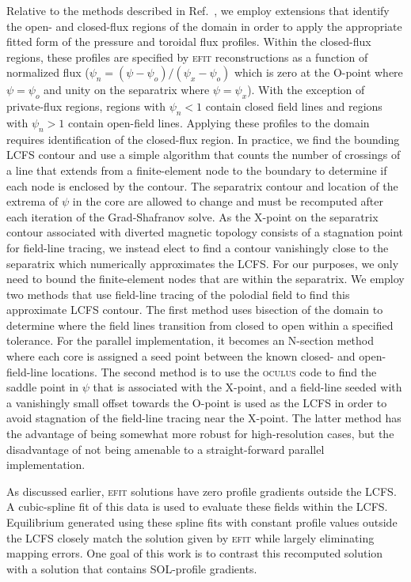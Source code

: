 \documentclass[english,aps,superscriptaddress,showkeys,showpacs,prepri,twocolumn]{revtex4}
\begin{document}
Relative to the methods described in Ref.~\cite{Howell14}, we employ extensions
that identify the open- and closed-flux regions of the domain in order to apply
the appropriate fitted form of the pressure and toroidal flux profiles. Within
the closed-flux regions, these profiles are specified by \textsc{efit}
reconstructions as a function of normalized flux
($\psi_n = (\psi - \psi_o)/(\psi_x - \psi_o)$ which is zero at the O-point
where $\psi=\psi_o$ and unity on the separatrix where $\psi=\psi_x$).  With the
exception of private-flux regions, regions with $\psi_n<1$ contain closed field
lines and regions with $\psi_n>1$ contain open-field lines. 
Applying these profiles to the domain requires identification
of the closed-flux region. In practice, we find the bounding LCFS contour and
use a simple algorithm that counts the number of crossings of a line that extends from a
finite-element node to the boundary to determine if each node is enclosed by
the contour.  The separatrix contour and location of the extrema of $\psi$ in the
core are allowed to change and must be recomputed after each iteration of the
Grad-Shafranov solve.  As the X-point on the separatrix contour associated with
diverted magnetic topology consists of a stagnation point for field-line
tracing, we instead elect to find a contour vanishingly close to the separatrix
which numerically approximates the LCFS. For
our purposes, we only need to bound the finite-element nodes that are within
the separatrix.  We employ two methods that use field-line tracing of the polodial
field to find this approximate LCFS contour.  The first method uses bisection
of the domain to determine where the field lines transition from closed to open
within a specified tolerance. For the parallel implementation, it becomes an
N-section method where each core is assigned a seed point between the known
closed- and open-field-line locations.  The second method is to use the
\textsc{oculus} code to find the saddle point in $\psi$ that is associated with
the X-point, and a field-line seeded with a vanishingly small offset towards
the O-point is used as the LCFS in order to avoid stagnation of the field-line
tracing near the X-point.  The latter method has the advantage of being
somewhat more robust for high-resolution cases, but the disadvantage of not
being amenable to a straight-forward parallel implementation.

As discussed earlier, \textsc{efit} solutions have zero profile gradients
outside the LCFS.  A cubic-spline fit of this data
is used to evaluate these fields within the LCFS.  Equilibrium generated using
these spline fits with constant profile values outside the LCFS closely match
the solution given by \textsc{efit} while largely eliminating mapping errors.
One goal of this work is to contrast this recomputed solution with a solution
that contains SOL-profile gradients.
\end{document}
